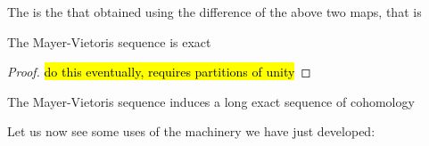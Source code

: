\documentclass{article}
\begin{document}
\begin{definition}
	The  is the that obtained using the difference of the above two maps, that is 
\end{definition}

\begin{prop}
	The Mayer-Vietoris sequence is exact	
\end{prop}
\begin{proof}
	\hl{do this eventually, requires partitions of unity}
\end{proof}

\begin{prop}
	The Mayer-Vietoris sequence induces a long exact sequence of cohomology
	\begin{center}
	\end{center}
\end{prop}

Let us now see some uses of the machinery we have just developed:
\end{document}
